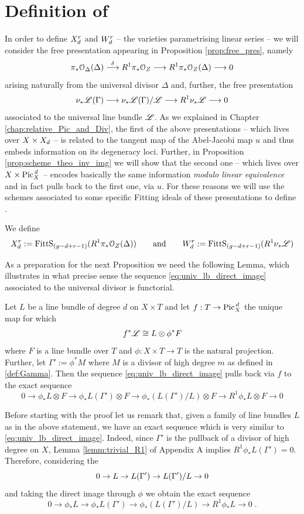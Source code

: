 \section{Definition of \modu}\label{sec:defi_modu}
	In order to define $X_d^r$ and $W_d^r$ -- the varieties parametrising linear series -- we will consider the free presentation appearing in Proposition \ref{prop:free_pres}, namely
	$$ 
	\pi_* \mathcal{O}_{\Delta}(\Delta)\overset{\delta}{\longrightarrow} R^1 \pi_* \mathcal{O}_Z\longrightarrow R^1 \pi_* \mathcal{O}_Z(\Delta) \longrightarrow 0 
	$$
	arising naturally from the universal divisor $\Delta$ and, further, the free presentation
	$$ 
	\nu_{*} \mathscr{L}(\Gamma)\longrightarrow \nu_{*} \mathscr{L}(\Gamma) / \mathscr{L} \longrightarrow R^1 \nu_{*} \mathscr{L} \longrightarrow 0
	$$
	associated to the universal line bundle $\mathscr{L}$.
	As we explained in Chapter \ref{chap:relative_Pic_and_Div}, the first of the above presentations -- which lives over $X\times X_d$ -- is related to the tangent map of the Abel-Jacobi map $u$ and thus embeds information on its degeneracy loci. 
	Further, in Proposition \ref{prop:scheme_theo_inv_img} we will show that the second one -- which lives over $X\times \operatorname{Pic}^{\,d}_X$ -- encodes basically the same information \emph{modulo linear equivalence} and in fact pulls back to the first one, via $u$. 
	For these reasons we will use the schemes associated to some specific Fitting ideals of these presentations to define \modu.
	\begin{defi}
		We define
		$$ X_d^r := \operatorname{FittS}_{(g-d+r-1)}(R^1\pi_* \mathcal{O}_Z(\Delta)) \qquad \text{and} \qquad  W_d^r := \operatorname{FittS}_{(g-d+r-1)}(R^1\nu_{*} \mathscr{L}) $$
	\end{defi}
	As a preparation for the next Proposition we need the following Lemma, which illustrates in what precise sense the sequence \eqref{eq:univ_lb_direct_image} associated to the universal divisor is functorial.
	\begin{lemm}\label{lemm:functoriality}
		Let $L$ be a line bundle of degree $d$ on $X\times T$ and let $f:T\to \operatorname{Pic}^{\,d}_X$ the unique map for which
		$$ f^*\mathscr{L} \cong L \otimes \phi^* F $$
		where $F$ is a line bundle over $T$ and $\phi: X\times T \to T$ is the natural projection. Further, let $\Gamma':= \phi^* M$ where $M$ is a divisor of high degree $m$ as defined in \ref{def:Gamma}.
		Then the sequence \eqref{eq:univ_lb_direct_image} pulls back via $f$ to the exact sequence
		$$ 0 \to \phi_*L\otimes F  \to \phi_* L(\Gamma')\otimes F \to \phi_* (L(\Gamma') / L)\otimes F  \to R^1 \phi_* L\otimes F  \to 0 $$ 
	\end{lemm}
	\begin{rema}
		Before starting with the proof let us remark that, given a family of line bundles $L$ as in the above statement, we have an exact sequence which is very similar to \eqref{eq:univ_lb_direct_image}. Indeed, since $\Gamma'$ is the pullback of a divisor of high degree on $X$, Lemma \ref{lemm:trivial_R1} of Appendix A implies $R^1\phi_* L(\Gamma') = 0$. Therefore, considering the \ses 
		$$ 0 \to L \to L(\Gamma') \to L(\Gamma')/L \to 0 $$
		and taking the direct image through $\phi$ we obtain the exact sequence
		$$ 0 \to \phi_*L  \to \phi_* L(\Gamma') \to \phi_* (L(\Gamma') / L)  \to R^1 \phi_* L  \to 0\;. $$
	\end{rema}
